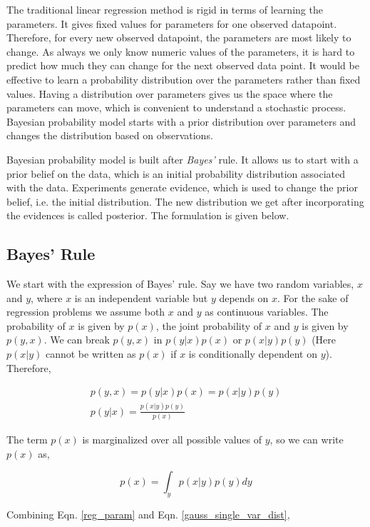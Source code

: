 \documentclass[english]{tktltiki}
\begin{document}
The traditional linear regression method is rigid in terms of learning the parameters. It gives fixed values for parameters for one observed datapoint. Therefore, for every new observed datapoint, the parameters are most likely to change. As always we only know numeric values of the parameters, it is hard to predict how much they can change for the next observed data point.  It would be effective to learn a probability distribution over the parameters rather than fixed values. Having a distribution over parameters gives us the space where the parameters can move, which is convenient to understand a stochastic process. Bayesian probability model starts with a prior distribution over parameters and changes the distribution based on observations.

Bayesian probability model is built after \textit{Bayes'} rule. It allows us to start with a prior belief on the data, which is an initial probability distribution associated with the data. Experiments generate evidence, which is used to change the prior belief, i.e. the initial distribution. The new distribution we get after incorporating the evidences is called posterior. The formulation is given below.

\subsection{Bayes' Rule}

We start with the expression of Bayes' rule. Say we have two random variables, $x$ and $y$, where $x$ is an independent variable but $y$ depends on $x$. For the sake of regression problems we assume both $x$ and $y$ as continuous variables. The probability of $x$ is given by $p(x)$, the joint probability of $x$ and $y$ is given by $p(y, x)$. We can break $p(y, x)$ in $p(y|x)p(x)$ or $p(x|y)p(y)$ (Here $p(x|y)$ cannot be written as $p(x)$ if $x$ is conditionally dependent on $y$). Therefore,

\begin{eqnarray}
p(y, x) = p(y|x)p(x) = p(x|y)p(y)\nonumber\\
p(y|x) = \frac{p(x|y)p(y)}{p(x)}
\end{eqnarray}


The term $p(x)$ is marginalized over all possible values of $y$, so we can write $p(x)$ as,

\begin{equation}
p(x) = \int_y{p(x|y)p(y)dy}
\end{equation}


Combining Eqn. \ref{reg_param} and Eqn. \ref{gauss_single_var_dist},
\end{document}
